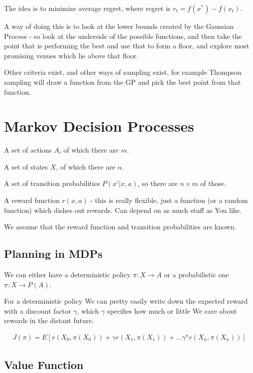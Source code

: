 \documentclass{article}
\begin{document}
		The idea is to minimize average regret, where regret is $r_t = f(x^*) - f(x_t)$.
		
		A way of doing this is to look at the lower bounds created by the Gaussian Process - so look at the underside of the possible functions, and then take the point that is performing the best and use that to form a floor, and explore most promising venues which lie above that floor. 
		
		Other criteria exist, and other ways of sampling exist, for example Thompson sampling will draw a function from the GP and pick the best point from that function.
		
\section{Markov Decision Processes}
		
	A set of actions $A$, of which there are $m$.
	
	A set of states $X$, of which there are $n$.
	
	A set of transition probabilities $P(x'|x, a)$, so there are $n\times m$ of those.
	
	A reward function $r(x, a)$ - this is really flexible, just a function (or a random function) which dishes out rewards. Can depend on as much stuff as You like.
	
	We assume that the reward function and transition probabilities are known.
	
	\subsection{Planning in MDPs}
		
		We can either have a deterministic policy $\pi:X\to A$ or a probabilistic one $\pi : X\to P(A)$.
		
		For a deterministic policy We can pretty easily write down the expected reward with a discount factor $\gamma$, which $\gamma$ specifies how much or little We care about rewards in the distant future.
		
		\begin{align}
			J(\pi) = E[ r(X_0, \pi(X_0)) + \gamma r(X_1, \pi(X_1)) + \ldots \gamma^n r(X_n, \pi(X_n))]
		\end{align}
		
	\subsection{Value Function}
	
\end{document}

